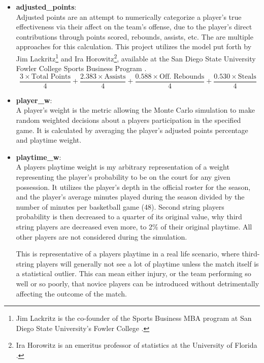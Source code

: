 \documentclass{thesis-ekf}
\theoremstyle{definition}
\theoremstyle{remark}
\begin{document}
\begin{itemize}
	\item \textbf{adjusted\_points}: \\
	Adjusted points are an attempt to numerically categorize a player's true effectiveness via their affect on the team's offense, due to the player's direct contributions through points scored, rebounds, assists, etc. The are multiple approaches for this calculation. This project utilizes the model put forth by Jim Lackritz\footnote{Jim Lackritz is the co-founder of the Sports Business MBA program at San Diego State University's Fowler College \cite{SDSU}.} and Ira Horowitz\footnote{Ira Horowitz is an emeritus professor of statistics at the University of Florida \cite{SDSU}.}, available at the San Diego State University Fowler College Sports Business Program \cite{SDSU}.
	\begin{equation}
		\label{eq-adj-pts}
		\tag{Model 5.1: Lackritz's Adjusted Points Equation}
		\frac{3 \times \text{Total Points}}{4} + \frac{2.383 \times \text{Assists}}{4} + \frac{0.588 \times \text{Off. Rebounds}}{4} + \frac{0.530 \times \text{Steals}}{4}
	\end{equation}
		
	\item \textbf{player\_w}: \\
	A player's weight is the metric allowing the Monte Carlo simulation to make random weighted decisions about a players participation in the specified game. It is calculated by averaging the player's adjusted points percentage and playtime weight.
	
	\item \textbf{playtime\_w}:\\
	A players playtime weight is my arbitrary representation of a weight representing the player's probability to be on the court for any given possession. It utilizes the player's depth in the official roster for the season, and the player's average minutes played during the season divided by the number of minutes per basketball game (48). Second string players probability is then decreased to a quarter of its original value, why third string players are decreased even more, to 2\% of their original playtime. All other players are not considered during the simulation. 
	
	This is representative of a players playtime in a real life scenario, where third-string players will generally not see a lot of playtime unless the match itself is a statistical outlier. This can mean either injury, or the team performing so well or so poorly, that novice players can be introduced without detrimentally affecting the outcome of the match.
	

\end{itemize}
\end{document}
